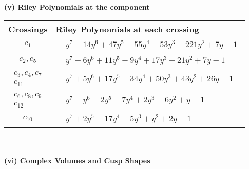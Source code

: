 \documentclass[1p]{elsarticle_modified}
\theoremstyle{definition}
\begin{document}
\newpage\renewcommand{\arraystretch}{1}
\flushleft \textbf{(v) Riley Polynomials at the component}\newline \\
\begin{tabular}{m{50pt}|m{274pt}}
Crossings & \hspace{64pt}Riley Polynomials at each crossing \\
\hline $$\begin{aligned}c_{1}\end{aligned}$$&$\begin{aligned}
&y^7-14 y^6+47 y^5+55 y^4+53 y^3-221 y^2+7 y-1
\end{aligned}$\\
\hline $$\begin{aligned}c_{2},c_{5}\end{aligned}$$&$\begin{aligned}
&y^7-6 y^6+11 y^5-9 y^4+17 y^3-21 y^2+7 y-1
\end{aligned}$\\
\hline $$\begin{aligned}c_{3},c_{4},c_{7}\\c_{11}\end{aligned}$$&$\begin{aligned}
&y^7+5 y^6+17 y^5+34 y^4+50 y^3+43 y^2+26 y-1
\end{aligned}$\\
\hline $$\begin{aligned}c_{6},c_{8},c_{9}\\c_{12}\end{aligned}$$&$\begin{aligned}
&y^7- y^6-2 y^5-7 y^4+2 y^3-6 y^2+y-1
\end{aligned}$\\
\hline $$\begin{aligned}c_{10}\end{aligned}$$&$\begin{aligned}
&y^7+2 y^5-17 y^4-5 y^3+y^2+2 y-1
\end{aligned}$\\
\hline
\end{tabular}\\~\\
\newpage\flushleft \textbf{(vi) Complex Volumes and Cusp Shapes}
\end{document}

